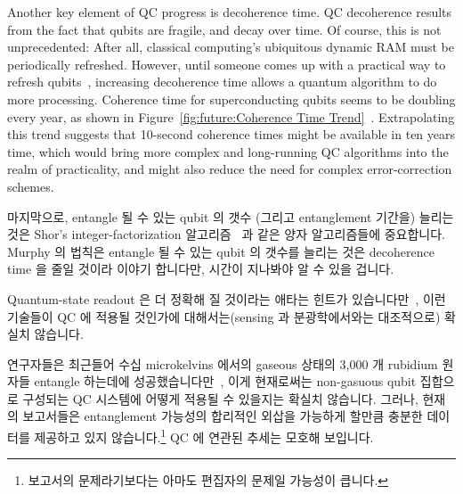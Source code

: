 Another key element of QC progress is decoherence time.
QC decoherence results from the fact that qubits are fragile, and
decay over time.
Of course, this is not unprecedented: After all, classical computing's
ubiquitous dynamic RAM must be periodically refreshed.
However, until someone comes up with a practical way to refresh
qubits~\cite{GiorgioColangelo2017QC-SpinAngleAmplitude},
increasing decoherence time allows a quantum algorithm to do more
processing.
Coherence time for superconducting qubits seems to be doubling every year,
as shown in
Figure~\ref{fig:future:Coherence Time Trend}~\cite{IBM2016QuantumExperience}.
Extrapolating this trend suggests that 10-second coherence times might
be available in ten years time, which would bring more complex and
long-running QC algorithms into the realm of practicality, and might
also reduce the need for complex error-correction schemes.
\fi

마지막으로, entangle 될 수 있는 qubit 의 갯수 (그리고 entanglement 기간을)
늘리는 것은 Shor's integer-factorization
알고리즘~\cite{Shor:1997:PAP:264393.264406,Kendon:2006:ERS:2011698.2011704} 과
같은 양자 알고리즘들에 중요합니다.
Murphy 의 법칙은 entangle 될 수 있는 qubit 의 갯수를 늘리는 것은 decoherence
time 을 줄일 것이라 이야기 합니다만, 시간이 지나봐야 알 수 있을 겁니다.

Quantum-state readout 은 더 정확해 질 것이라는 애타는 힌트가
있습니다만~\cite{GiorgioColangelo2017QC-SpinAngleAmplitude}, 이런 기술들이 QC
에 적용될 것인가에 대해서는(sensing 과 분광학에서와는 대조적으로) 확실치
않습니다.

연구자들은 최근들어 수십 microkelvins 에서의 gaseous 상태의 3,000 개 rubidium
원자들 entangle 하는데에
성공했습니다만~\cite{RobertMcConnell2015QC-Entangle3000Atoms}, 이게 현재로써는
non-gasuous qubit 집합으로 구성되는 QC 시스템에 어떻게 적용될 수 있을지는
확실치 않습니다.
그러나, 현재의 보고서들은 entanglement 가능성의 합리적인 외삽을 가능하게 할만큼
충분한 데이터를 제공하고 있지 않습니다.\footnote{
	보고서의 문제라기보다는 아마도 편집자의 문제일 가능성이 큽니다.}
QC 에 연관된 추세는 모호해 보입니다.

